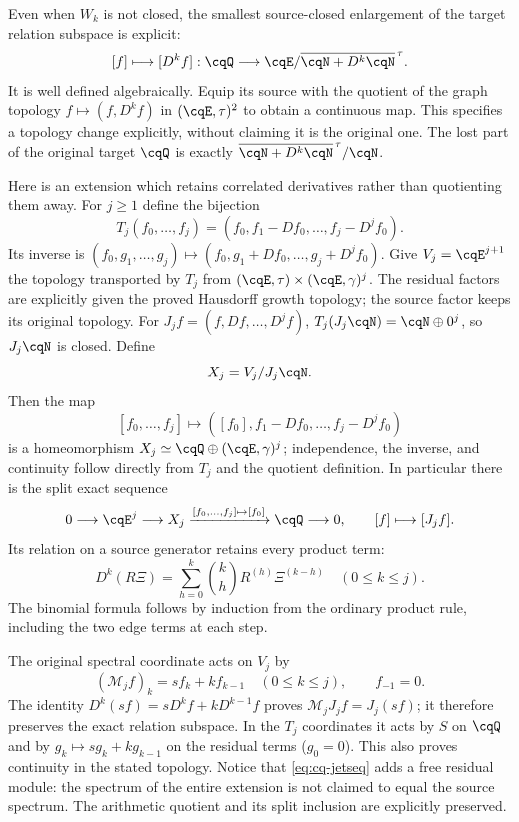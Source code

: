 Even when $W_k$ is not closed, the smallest source-closed enlargement
of the target relation subspace is explicit:
\begin{equation}\label{eq:cq-target}
 [f]\longmapsto[D^kf]:
 \cqQ\longrightarrow
 \cqE/\overline{\cqN+D^k\cqN}^{\,\tau}.
\end{equation}
It is well defined algebraically. Equip its source with the quotient
of the graph topology $f\mapsto(f,D^kf)$ in
$(\cqE,\tau)^2$ to obtain a continuous map. This specifies a
topology change explicitly, without claiming it is the original one.
The lost part of the original target $\cqQ$ is exactly
$\overline{\cqN+D^k\cqN}^{\,\tau}/\cqN$.

Here is an extension which retains correlated derivatives rather than
quotienting them away. For $j\geq1$ define the bijection
\[
 T_j(f_0,\ldots,f_j)
   =(f_0,f_1-Df_0,\ldots,f_j-D^jf_0).
\]
Its inverse is $(f_0,g_1,\ldots,g_j)\mapsto
(f_0,g_1+Df_0,\ldots,g_j+D^jf_0)$.
Give $V_j=\cqE^{j+1}$ the topology transported by $T_j$ from
$(\cqE,\tau)\times(\cqE,\gamma)^j$. The residual factors
are explicitly given the proved Hausdorff growth topology; the
source factor keeps its original topology. For $J_jf=(f,Df,\ldots,D^jf)$,
$T_j(J_j\cqN)=\cqN\oplus0^j$, so $J_j\cqN$ is closed.
Define
\begin{equation}\label{eq:cq-jetextension}
 X_j=V_j/J_j\cqN.
\end{equation}
Then the map
\[
 [f_0,\ldots,f_j]\longmapsto
 ([f_0],f_1-Df_0,\ldots,f_j-D^jf_0)
\]
is a homeomorphism $X_j\simeq\cqQ\oplus(\cqE,\gamma)^j$; independence,
the inverse, and continuity follow directly from $T_j$ and the
quotient definition. In particular there is the split exact sequence
\begin{equation}\label{eq:cq-jetseq}
 0\longrightarrow\cqE^j\longrightarrow X_j
 \xrightarrow{[f_0,\ldots,f_j]\mapsto[f_0]}\cqQ
 \longrightarrow0,
 \qquad [f]\longmapsto[J_jf].
\end{equation}
Its relation on a source generator retains every product term:
\begin{equation}\label{eq:cq-rawjet}
 D^k(R\Xi)=\sum_{h=0}^k\binom kh R^{(h)}\Xi^{(k-h)}
                    \quad(0\leq k\leq j).
\end{equation}
The binomial formula follows by induction from the ordinary product
rule, including the two edge terms at each step.

The original spectral coordinate acts on $V_j$ by
\[
 (\mathcal M_j f)_k=s f_k+k f_{k-1}\quad(0\leq k\leq j),
 \qquad f_{-1}=0.
\]
The identity $D^k(sf)=sD^kf+kD^{k-1}f$ proves
$\mathcal M_jJ_jf=J_j(sf)$; it therefore preserves the exact
relation subspace. In the $T_j$ coordinates it acts by $S$ on
$\cqQ$ and by $g_k\mapsto sg_k+kg_{k-1}$ on the residual terms
($g_0=0$). This also proves continuity in the stated topology.
Notice that \eqref{eq:cq-jetseq} adds a free residual module:
the spectrum of the entire extension is not claimed to equal the
source spectrum. The arithmetic quotient and its split inclusion
are explicitly preserved.

